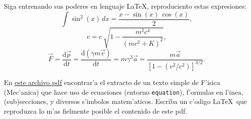 \documentclass[11pt]{exam}
\begin{document}
\begin{questions}
\item Siga entrenando sus poderes en lenguaje \LaTeX, reproduciento estas expresiones:
\begin{equation}
\int \sin^2(x)\,dx=\frac{x-\sin (x)\,\cos (x)}{2}  ,
\end{equation}
\begin{equation}
v = c \ \sqrt{1- \frac{{m^2 c^4}}{{(mc^2+K)^2}}},
\end{equation}
\begin{equation}
\vec{F} = \frac{\text{d}\vec{p}}{\text{d}t} = \frac{\text{d}(\gamma m \vec{v})}{\text{d}t} = m \gamma^3 \vec{a} = \frac{m \vec{a}}{[1-(v^2/c^2)]^{3/2}}.
\end{equation}


\item En \href{https://github.com/gfrubi/CC/blob/master/guias/04/ejemplo-g4.pdf}{este archivo pdf} encontrar'a el extracto de un texto simple de F'isica (Mec'anica) que hace uso de ecuaciones (entorno \texttt{equation}), f'ormulas en l'inea, (sub)secciones, y diversos s'imbolos matem'aticos. Escriba un c'odigo \LaTeX\ que reproduzca lo m'as fielmente posible el contenido de este pdf.
\end{questions}
\end{document}
